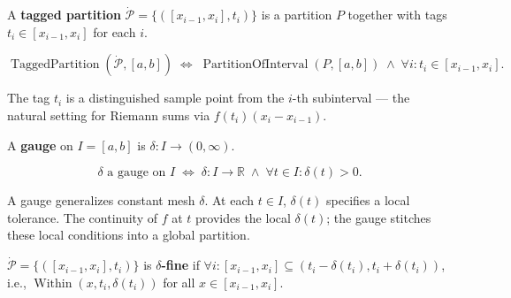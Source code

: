 \begin{definition}
\label{def:tagged-partition}
A \textbf{tagged partition} $\dot{\mathcal{P}}=\{([x_{i-1},x_i],t_i)\}$
is a partition $P$ together with tags $t_i\in[x_{i-1},x_i]$ for each $i$.
\end{definition}

\begin{remark*}
\[
  \operatorname{TaggedPartition}(\dot{\mathcal{P}},[a,b])
  \;\iff\;
  \operatorname{PartitionOfInterval}(P,[a,b])
  \;\wedge\;
  \forall i: t_i\in[x_{i-1},x_i].
\]
\end{remark*}

\begin{remark*}[Interpretation]
The tag $t_i$ is a distinguished sample point from the $i$-th
subinterval — the natural setting for Riemann sums via $f(t_i)
(x_i-x_{i-1})$.
\end{remark*}


\begin{tcolorbox}[title={Definition --- Gauge}]
\begin{definition}[Gauge]
\label{def:gauge}
A \textbf{gauge} on $I=[a,b]$ is $\delta:I\to(0,\infty)$.
\end{definition}
\end{tcolorbox}

\begin{remark*}
\[
  \delta\text{ a gauge on }I
  \;\iff\;
  \delta:I\to\mathbb{R} \;\wedge\; \forall t\in I:\delta(t)>0.
\]
\end{remark*}

\begin{remark*}[Interpretation]
A gauge generalizes constant mesh $\delta$. At each $t\in I$,
$\delta(t)$ specifies a local tolerance. The continuity of $f$ at
$t$ provides the local $\delta(t)$; the gauge stitches these local
conditions into a global partition.
\end{remark*}


\begin{definition}
\label{def:delta-fine-partition}
$\dot{\mathcal{P}}=\{([x_{i-1},x_i],t_i)\}$ is
\textbf{$\delta$-fine} if $\forall i:
[x_{i-1},x_i]\subseteq(t_i-\delta(t_i),t_i+\delta(t_i))$,
i.e., $\operatorname{Within}(x,t_i,\delta(t_i))$ for all
$x\in[x_{i-1},x_i]$.
\end{definition}

